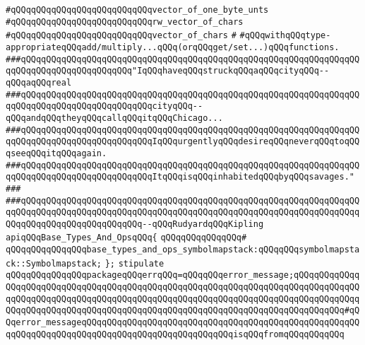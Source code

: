 \verb|#qQQqqQQqqQQqqQQqqQQqqQQqqQQqvector_of_one_byte_unts|\newline
\verb|#qQQqqQQqqQQqqQQqqQQqqQQqqQQqrw_vector_of_chars|\newline
\verb|#qQQqqQQqqQQqqQQqqQQqqQQqqQQqvector_of_chars|\newline
\verb|#|\newline
\verb|#qQQqwithqQQqtype-appropriateqQQqadd/multiply...qQQq(orqQQqget/set...)qQQqfunctions.|\newline
\newline
\newline
\newline
\verb|###qQQqqQQqqQQqqQQqqQQqqQQqqQQqqQQqqQQqqQQqqQQqqQQqqQQqqQQqqQQqqQQqqQQqqQQqqQQqqQQqqQQqqQQqqQQq"IqQQqhaveqQQqstruckqQQqaqQQqcityqQQq--qQQqaqQQqreal|\newline
\verb|###qQQqqQQqqQQqqQQqqQQqqQQqqQQqqQQqqQQqqQQqqQQqqQQqqQQqqQQqqQQqqQQqqQQqqQQqqQQqqQQqqQQqqQQqqQQqqQQqcityqQQq--qQQqandqQQqtheyqQQqcallqQQqitqQQqChicago...|\newline
\verb|###qQQqqQQqqQQqqQQqqQQqqQQqqQQqqQQqqQQqqQQqqQQqqQQqqQQqqQQqqQQqqQQqqQQqqQQqqQQqqQQqqQQqqQQqqQQqqQQqIqQQqurgentlyqQQqdesireqQQqneverqQQqtoqQQqseeqQQqitqQQqagain.|\newline
\verb|###qQQqqQQqqQQqqQQqqQQqqQQqqQQqqQQqqQQqqQQqqQQqqQQqqQQqqQQqqQQqqQQqqQQqqQQqqQQqqQQqqQQqqQQqqQQqqQQqItqQQqisqQQqinhabitedqQQqbyqQQqsavages."|\newline
\verb|###|\newline
\verb|###qQQqqQQqqQQqqQQqqQQqqQQqqQQqqQQqqQQqqQQqqQQqqQQqqQQqqQQqqQQqqQQqqQQqqQQqqQQqqQQqqQQqqQQqqQQqqQQqqQQqqQQqqQQqqQQqqQQqqQQqqQQqqQQqqQQqqQQqqQQqqQQqqQQqqQQqqQQqqQQqqQQq--qQQqRudyardqQQqKipling|\newline
\newline
\newline
\newline
\verb|apiqQQqBase_Types_And_OpsqQQq{|\newline
\verb|qQQqqQQqqQQqqQQq#|\newline
\verb|qQQqqQQqqQQqqQQqbase_types_and_ops_symbolmapstack:qQQqqQQqsymbolmapstack::Symbolmapstack;|\newline
\verb|};|\newline
\newline
\newline
\verb|stipulate|\newline
\verb|qQQqqQQqqQQqqQQqpackageqQQqerrqQQq=qQQqqQQqerror_message;qQQqqQQqqQQqqQQqqQQqqQQqqQQqqQQqqQQqqQQqqQQqqQQqqQQqqQQqqQQqqQQqqQQqqQQqqQQqqQQqqQQqqQQqqQQqqQQqqQQqqQQqqQQqqQQqqQQqqQQqqQQqqQQqqQQqqQQqqQQqqQQqqQQqqQQqqQQqqQQqqQQqqQQqqQQqqQQqqQQqqQQqqQQqqQQqqQQqqQQqqQQqqQQqqQQqqQQqqQQq#qQQqerror_messageqQQqqQQqqQQqqQQqqQQqqQQqqQQqqQQqqQQqqQQqqQQqqQQqqQQqqQQqqQQqqQQqqQQqqQQqqQQqqQQqqQQqqQQqqQQqqQQqqQQqisqQQqfromqQQqqQQqqQQq|\newline
